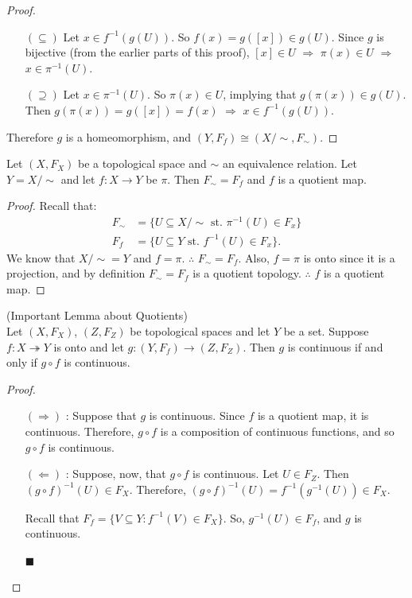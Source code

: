 \begin{proof}
\begin{itemize}
		\begin{itemize}
			\item[$(\subseteq)$] Let $x \in f^{-1}(g(U))$. So $f(x)=g([x]) \in g(U)$. Since $g$ is bijective (from the earlier parts of this proof), $[x] \in U$ $\Rightarrow$ $\pi(x) \in U$ $\Rightarrow$ $x \in \pi^{-1}(U)$. 
			\item[$(\supseteq)$] Let $x \in \pi^{-1}(U)$. So $\pi(x) \in U$, implying that $g(\pi(x)) \in g(U)$. Then $g(\pi(x)) = g([x]) = f(x)$ $\Rightarrow$ $x \in f^{-1}(g(U))$. 
		\end{itemize}
	\end{itemize}
	Therefore $g$ is a homeomorphism, and $(Y,F_f) \cong (X/\sim,F_\sim)$. 
\end{proof}
\begin{theorem}
	Let $(X,F_X)$ be a topological space and $\sim$ an equivalence relation. Let $Y = X/\sim$ and let $f : X \rightarrow Y$ be $\pi$. Then $F_\sim = F_f$ and $f$ is a quotient map. 
\end{theorem}
\begin{proof}
	Recall that: 
	\begin{align*}
		F_\sim &= \{ U \subseteq X/\sim \text{ st. } \pi^{-1} (U) \in F_x \} \\
		F_f &= \{ U \subseteq Y \text{ st. } f^{-1} (U) \in F_x \}. 
	\end{align*}
	We know that $X/\sim = Y$ and $f = \pi$. $\therefore$ $F_\sim = F_f$. Also, $f = \pi$ is onto since it is a projection, and by definition $F_\sim = F_f$ is a quotient topology. $\therefore$ $f$ is a quotient map. 
\end{proof}
\begin{lemma}
	(Important Lemma about Quotients)\\
	Let $(X,F_X)$, $(Z,F_Z)$ be topological spaces and let $Y$ be a set. Suppose $f: X \twoheadrightarrow Y$ is onto and let $g: (Y,F_f) \rightarrow (Z,F_Z)$. Then $g$ is continuous if and only if $g \circ f$ is continuous. 
\end{lemma}
\begin{proof}
	\begin{itemize}
		\item[$(\Rightarrow)$]: Suppose that $g$ is continuous. Since $f$ is a quotient map, it is continuous. Therefore, $g\circ f$ is a composition of continuous functions, and so $g\circ f$ is continuous.
		
		\item[$(\Leftarrow)$]: Suppose, now, that $g\circ f$ is continuous. Let $U\in F_Z$. Then $(g\circ f)^{-1}(U)\in F_X$. Therefore, $(g\circ f)^{-1}(U) = f^{-1}(g^{-1}(U)) \in F_X$.
		
		Recall that $F_f = \{ V\subseteq Y : f^{-1}(V)\in F_X\}$. So, $g^{-1}(U) \in F_f$, and $g$ is continuous. 
		\begin{flushright}
			$\blacksquare$ 
		\end{flushright}
	\end{itemize}
\end{proof}
